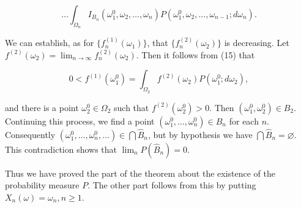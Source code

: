 $$\dots \int_{\Omega_n} I_{B_n}(\omega_1^0, \omega_2, \dots, \omega_n) P(\omega_1^0, \omega_2, \dots, \omega_{n-1}; d\omega_n).$$

We can establish, as for $\{f_n^{(1)}(\omega_1)\}$, that $\{f_n^{(2)}(\omega_2)\}$ is decreasing. Let $f^{(2)}(\omega_2) = \lim_{n \to \infty} f_n^{(2)}(\omega_2)$. Then it follows from (15) that

$$0 < f^{(1)}(\omega_1^0) = \int_{\Omega_2} f^{(2)}(\omega_2) P(\omega_1^0; d\omega_2),$$

and there is a point $\omega_2^0 \in \Omega_2$ such that $f^{(2)}(\omega_2^0) > 0$. Then $(\omega_1^0, \omega_2^0) \in B_2$. Continuing this process, we find a point $(\omega_1^0, \dots, \omega_n^0) \in B_n$ for each $n$. Consequently $(\omega_1^0, \dots, \omega_n^0, \dots) \in \bigcap \hat{B}_n$, but by hypothesis we have $\bigcap \hat{B}_n = \varnothing$. This contradiction shows that $\lim_n P(\hat{B}_n) = 0$.

Thus we have proved the part of the theorem about the existence of the probability measure $P$. The other part follows from this by putting $X_n(\omega) = \omega_n, n \geq 1$.
